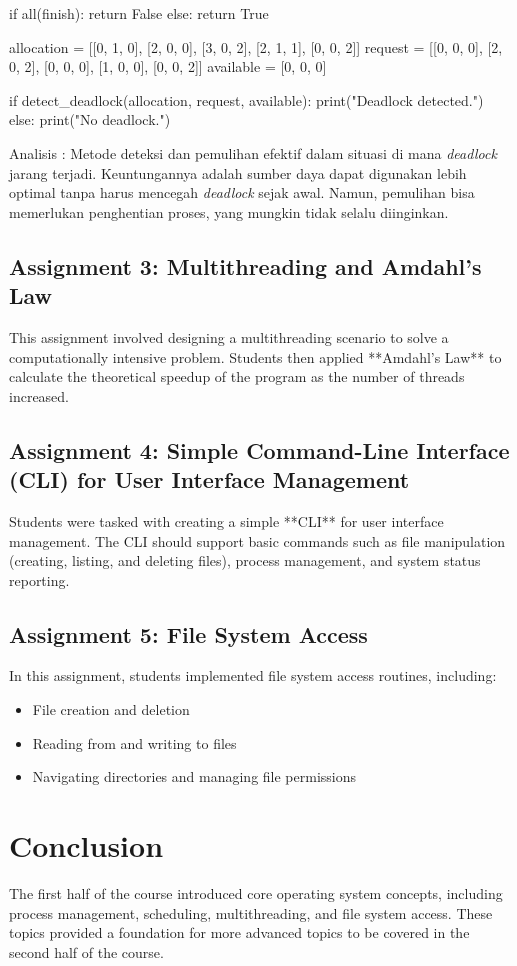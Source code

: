 \documentclass[12pt]{article}
\begin{document}
\begin{enumerate}
\begin{python}
    if all(finish):
        return False
    else:
        return True

allocation = [[0, 1, 0], [2, 0, 0], [3, 0, 2], [2, 1, 1], [0, 0, 2]]
request = [[0, 0, 0], [2, 0, 2], [0, 0, 0], [1, 0, 0], [0, 0, 2]]
available = [0, 0, 0]

if detect_deadlock(allocation, request, available):
    print("Deadlock detected.")
else:
    print("No deadlock.")
    \end{python}

    Analisis : Metode deteksi dan pemulihan efektif dalam situasi di mana \textit{deadlock} jarang terjadi. Keuntungannya adalah sumber daya dapat digunakan lebih optimal tanpa harus mencegah \textit{deadlock} sejak awal. Namun, pemulihan bisa memerlukan penghentian proses, yang mungkin tidak selalu diinginkan.
\end{enumerate}

\subsection{Assignment 3: Multithreading and Amdahl's Law}
This assignment involved designing a multithreading scenario to solve a computationally intensive problem. Students then applied **Amdahl's Law** to calculate the theoretical speedup of the program as the number of threads increased.

\subsection{Assignment 4: Simple Command-Line Interface (CLI) for User Interface Management}
Students were tasked with creating a simple **CLI** for user interface management. The CLI should support basic commands such as file manipulation (creating, listing, and deleting files), process management, and system status reporting.

\subsection{Assignment 5: File System Access}
In this assignment, students implemented file system access routines, including:
\begin{itemize}
    \item File creation and deletion
    \item Reading from and writing to files
    \item Navigating directories and managing file permissions
\end{itemize}

\section{Conclusion}
The first half of the course introduced core operating system concepts, including process management, scheduling, multithreading, and file system access. These topics provided a foundation for more advanced topics to be covered in the second half of the course.
\end{document}
